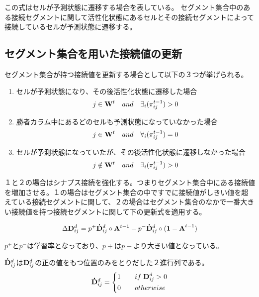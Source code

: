 この式はセルが予測状態に遷移する場合を表している。
セグメント集合中のある接続セグメントに関して活性化状態にあるセルとその接続セグメントによって接続しているセルが予測状態に遷移する。
\subsection{セグメント集合を用いた接続値の更新}
セグメント集合が持つ接続値を更新する場合として以下の３つが挙げられる。
\begin{enumerate}
  \item セルが予測状態になり、その後活性化状態に遷移した場合
  \begin{equation}
    j \in {\bf W}^ t \quad and \quad \exists_{i}(\pi^{t-1}_{ij}) > 0
  \end{equation}

  \item 勝者カラム中にあるどのセルも予測状態になっていなかった場合
  \begin{equation}
    j \in {\bf W}^t \quad and \quad \forall_{i}(\pi^{t-1}_{ij}) = 0
  \end{equation}

  \item セルが予測状態になっていたが、その後活性化状態に遷移しなかった場合
  \begin{equation}
    j \notin {\bf W}^ t \quad and \quad \exists_{i}(\pi^{t-1}_{ij}) > 0
  \end{equation}

\end{enumerate}

１と２の場合はシナプス接続を強化する。つまりセグメント集合中にある接続値を増加させる。１の場合はセグメント集合の中ですでに接続値がしきい値を超えている接続セグメントに関して、２の場合はセグメント集合のなかで一番大きい接続値を持つ接続セグメントに関して下の更新式を適用する。

\begin{equation}
  \Delta {\bf D}^d_{ij} = p^+{\bf \dot{D}}^d_{ij} \circ {\bf A}^{t-1} - p^-{\bf \dot{D}}^d_{ij} \circ {\bf (1 - A}^{t-1})
\end{equation}

$p^+$と$p^-$は学習率となっており、$p+$は$p-$より大きい値となっている。

${\bf \dot{D}}^d_{ij}$は${\bf D}^d_{ij}$の正の値をもつ位置のみをとりだした２進行列である。
\begin{equation}
  {\bf \dot{D}}^d_{ij} =
  \left\{
  \begin{alignedat}{2}
    1 \qquad &if \; {\bf D}^d_{ij} > 0\\
    0 \qquad &otherwise
  \end{alignedat}
  \right.
\end{equation}

